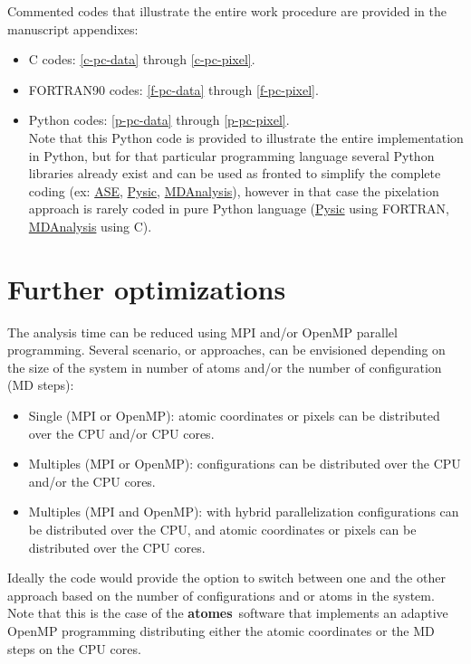 \documentclass[9pt,tutorial]{livecoms}
\newcommand{\atomes}{{\bf{atomes}}}
\begin{document}
Commented codes that illustrate the entire work procedure are provided in the manuscript appendixes: 
\begin{itemize}
\item C codes: \ref{c-pc-data} through \ref{c-pc-pixel}.
\item FORTRAN90 codes: \ref{f-pc-data} through \ref{f-pc-pixel}.
\item Python codes: \ref{p-pc-data} through \ref{p-pc-pixel}. \\
Note that this Python code is provided to illustrate the entire implementation in Python, but for that particular programming language
several Python libraries already exist and can be used as fronted to simplify the complete coding (ex: \href{https://ase-lib.org/}{ASE}, \href{https://thynnine.github.io/pysic/}{Pysic}, \href{https://www.mdanalysis.org/}{MDAnalysis}), 
however in that case the pixelation approach is rarely coded in pure Python language (\href{https://thynnine.github.io/pysic/}{Pysic} using FORTRAN, \href{https://www.mdanalysis.org/}{MDAnalysis} using C).
\end{itemize}

\section{Further optimizations}

The analysis time can be reduced using MPI and/or OpenMP parallel programming. 
Several scenario, or approaches, can be envisioned depending on the size of the system in number of atoms and/or the number of configuration (MD steps): 
\begin{itemize}
\item Single (MPI or OpenMP): atomic coordinates or pixels can be distributed over the CPU and/or CPU cores.
\item Multiples (MPI or OpenMP): configurations can be distributed over the CPU and/or the CPU cores. 
\item Multiples (MPI and OpenMP): with hybrid parallelization configurations can be distributed over the CPU, and atomic coordinates or pixels can be distributed over the CPU cores. 
\end{itemize}
Ideally the code would provide the option to switch between one and the other approach based on the number of configurations and or atoms in the system. \\ 
Note that this is the case of the \atomes\ software \cite{CMSatomes} that implements an adaptive OpenMP programming distributing 
either the atomic coordinates or the MD steps on the CPU cores. 
\end{document}
